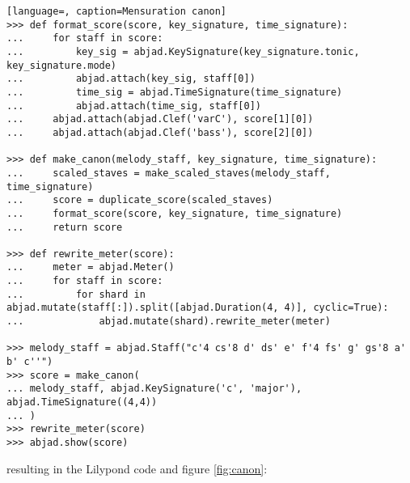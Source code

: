 \begin{lstlisting}[language=, caption=Mensuration canon]
>>> def format_score(score, key_signature, time_signature):
...     for staff in score:
...         key_sig = abjad.KeySignature(key_signature.tonic, key_signature.mode)
...         abjad.attach(key_sig, staff[0])
...         time_sig = abjad.TimeSignature(time_signature)
...         abjad.attach(time_sig, staff[0])
...     abjad.attach(abjad.Clef('varC'), score[1][0])
...     abjad.attach(abjad.Clef('bass'), score[2][0])

>>> def make_canon(melody_staff, key_signature, time_signature):
...     scaled_staves = make_scaled_staves(melody_staff, time_signature)
...     score = duplicate_score(scaled_staves)
...     format_score(score, key_signature, time_signature)
...     return score

>>> def rewrite_meter(score):
...     meter = abjad.Meter()
...     for staff in score:
...         for shard in abjad.mutate(staff[:]).split([abjad.Duration(4, 4)], cyclic=True):
...             abjad.mutate(shard).rewrite_meter(meter)

>>> melody_staff = abjad.Staff("c'4 cs'8 d' ds' e' f'4 fs' g' gs'8 a' b' c''")
>>> score = make_canon(
...	melody_staff, abjad.KeySignature('c', 'major'), abjad.TimeSignature((4,4))
...	)
>>> rewrite_meter(score)
>>> abjad.show(score)
\end{lstlisting}
\doublespace

resulting in the Lilypond code and figure \ref{fig:canon}:

